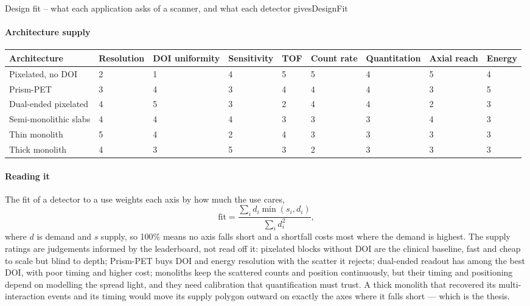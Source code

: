 \begin{programnote}{Design fit -- what each application asks of a scanner, and what each detector gives}{DesignFit}
\paragraph{Architecture supply}

\begin{center}
\begin{scriptsize}
\setlength{\tabcolsep}{2.5pt}
\begin{tabular}{lllllllll}
\hline
Architecture & Resolution & DOI uniformity & Sensitivity & TOF & Count rate & Quantitation & Axial reach & Energy \\
\hline
Pixelated, no DOI & 2 & 1 & 4 & 5 & 5 & 4 & 5 & 4 \\
Prism-PET & 3 & 4 & 3 & 4 & 4 & 4 & 3 & 5 \\
Dual-ended pixelated & 4 & 5 & 3 & 2 & 4 & 4 & 2 & 3 \\
Semi-monolithic slabs & 4 & 4 & 4 & 3 & 3 & 3 & 4 & 3 \\
Thin monolith & 5 & 4 & 2 & 4 & 3 & 3 & 3 & 3 \\
Thick monolith & 4 & 3 & 5 & 3 & 2 & 3 & 3 & 3 \\
\hline
\end{tabular}
\end{scriptsize}
\end{center}

\paragraph{Reading it}
The fit of a detector to a use weights each axis by how much the use cares,
\[ \mathrm{fit} = \frac{\sum_i d_i \min(s_i, d_i)}{\sum_i d_i^2}, \]
where $d$ is demand and $s$ supply, so 100\% means no axis falls short and a shortfall costs most where the
demand is highest. The supply ratings are judgements informed by the leaderboard, not read off
it: pixelated
blocks without DOI are the clinical baseline, fast and cheap to scale but
blind to depth; Prism-PET buys DOI and energy resolution with the scatter it
rejects; dual-ended readout has among the best DOI, with poor timing and higher cost;
monoliths keep the scattered counts and position continuously, but their
timing and positioning depend on modelling the spread light, and they need
calibration that quantification must trust. A thick monolith that recovered its
multi-interaction events and its timing would move its supply polygon
outward on exactly the axes where it falls short --- which is the thesis.

\end{programnote}


